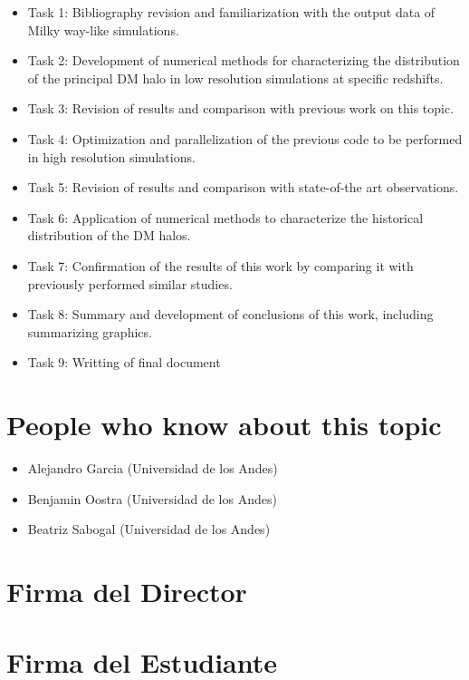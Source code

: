 \documentclass[12pt]{article}
\begin{document}
\begin{itemize}
	\item Task 1: Bibliography revision and familiarization with the output data of Milky way-like simulations.
	\item Task 2: Development of numerical methods for characterizing the distribution of the principal DM halo in low resolution simulations at specific redshifts.
	\item Task 3: Revision of results and comparison with  previous work on this topic.
	\item Task 4: Optimization and parallelization of the previous code to be performed in high resolution simulations.
	\item Task 5: Revision of results and comparison with state-of-the art observations.
	\item Task 6: Application of numerical methods to characterize the historical distribution of the DM halos.
	\item Task 7: Confirmation of the results of this work by comparing it with previously performed similar studies.
	\item Task 8: Summary and development of conclusions of this work, including summarizing graphics.
	\item Task 9: Writting of final document
\end{itemize}

\section{People who know about this topic}


\begin{itemize}
	\item Alejandro Garcia (Universidad de los Andes)
	\item Benjamin Oostra (Universidad de los Andes)
	\item Beatriz Sabogal (Universidad de los Andes)
\end{itemize}







\section*{Firma del Director}
\vspace{1.5cm}

\section*{Firma del Estudiante}
\end{document}
